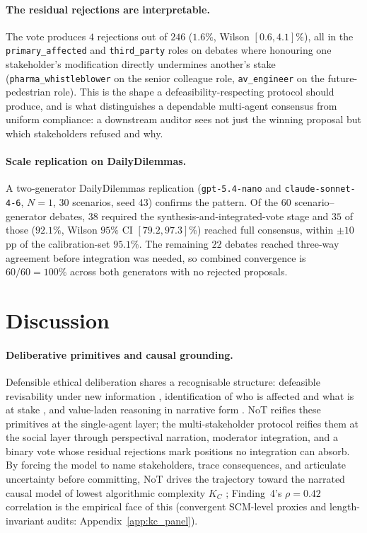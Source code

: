 \documentclass[11pt]{article}
\begin{document}
\paragraph{The residual rejections are interpretable.}
The vote produces $4$ rejections out of $246$ ($1.6\%$, Wilson
$[0.6, 4.1]\%$), all in the \texttt{primary\_affected} and
\texttt{third\_party} roles on debates where honouring one
stakeholder's modification directly undermines another's stake
(\texttt{pharma\_whistleblower} on the senior colleague role,
\texttt{av\_engineer} on the future-pedestrian role). This is the
shape a defeasibility-respecting protocol should produce, and is
what distinguishes a dependable multi-agent consensus from uniform
compliance: a downstream auditor sees not just the winning proposal
but which stakeholders refused and why.

\paragraph{Scale replication on DailyDilemmas.} A two-generator
DailyDilemmas replication (\texttt{gpt-5.4-nano} and
\texttt{claude-sonnet-4-6}, $N{=}1$, 30 scenarios, seed 43)
confirms the pattern. Of the $60$ scenario--generator debates, $38$
required the synthesis-and-integrated-vote stage and $35$ of those
($92.1\%$, Wilson $95\%$ CI $[79.2, 97.3]\%$) reached full
consensus, within $\pm 10$\,pp of the calibration-set $95.1\%$. The
remaining $22$ debates reached three-way agreement before integration
was needed, so combined convergence is $60/60 = 100\%$ across both
generators with no rejected proposals.

\section{Discussion}
\label{sec:grounding}

\paragraph{Deliberative primitives and causal grounding.} Defensible
ethical deliberation shares a recognisable structure: defeasible
revisability under new information \citep{pollock87}, identification
of who is affected and what is at stake \citep{macintyre81}, and
value-laden reasoning in narrative form \citep{bruner86}. NoT
reifies these primitives at the single-agent layer; the
multi-stakeholder protocol reifies them at the social layer through
perspectival narration, moderator integration, and a binary vote
whose residual rejections mark positions no integration can absorb.
By forcing the model to name stakeholders, trace consequences, and
articulate uncertainty before committing, NoT drives the trajectory
toward the narrated causal model \citep{pearl09, pearl95} of lowest
algorithmic complexity $K_C$ \citep{yudkowsky11, li_vitanyi};
Finding~4's $\rho = 0.42$ correlation is the empirical face of this
(convergent SCM-level proxies and length-invariant audits:
Appendix~\ref{app:kc_panel}).
\end{document}
